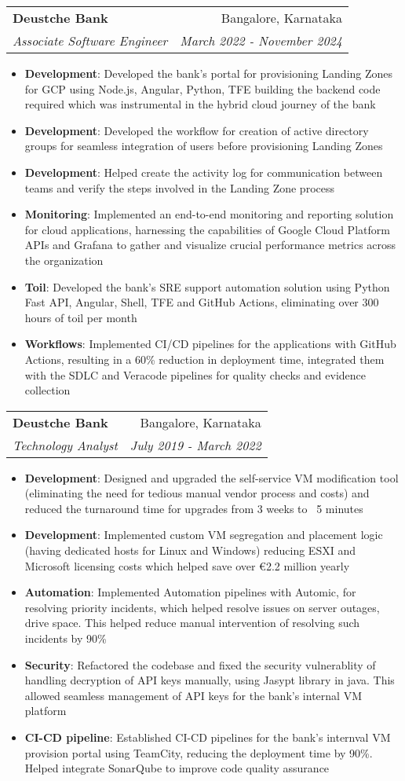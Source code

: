 \documentclass[letterpaper,11pt]{article}
\makeatletter
\newcommand{\resumeItem}[2]{
  \item\small{
    \textbf{#1}{: #2 \vspace{-2pt}}
  }
}
\newcommand{\resumeSubheading}[4]{
  \vspace{-1pt}\item
    \begin{tabular*}{0.97\textwidth}[t]{l@{\extracolsep{\fill}}r}
      \textbf{#1} & #2 \\
      \textit{\small#3} & \textit{\small #4} \\
    \end{tabular*}\vspace{-5pt}
}
\newcommand{\resumeItemListStart}{\begin{itemize}}
\newcommand{\resumeItemListEnd}{\end{itemize}\vspace{-5pt}}
\makeatother
\begin{document}
    \resumeSubheading
      {Deustche Bank}{Bangalore, Karnataka}
      {Associate Software Engineer}{March 2022 - November 2024}
      \resumeItemListStart
        \resumeItem{Development}
          {Developed the bank's portal for provisioning Landing Zones for GCP using Node.js, Angular, Python, TFE building the backend code required which was instrumental in the hybrid cloud journey of the bank}
        \resumeItem{Development}
          {Developed the workflow for creation of active directory groups for seamless integration of users before provisioning Landing Zones}
        \resumeItem{Development}
          {Helped create the activity log for communication between teams and verify the steps involved in the Landing Zone process}
        \resumeItem{Monitoring}
          {Implemented an end-to-end monitoring and reporting solution for cloud applications, harnessing the capabilities of Google Cloud Platform APIs and Grafana to gather and visualize crucial performance metrics across the organization}     
        \resumeItem{Toil}
          {Developed the bank's SRE support automation solution using Python Fast API, Angular, Shell, TFE and GitHub Actions, eliminating over 300 hours of toil per month}
        \resumeItem{Workflows}
          {Implemented CI/CD pipelines for the applications with GitHub Actions, resulting in a 60\% reduction in deployment time, integrated them with the SDLC and Veracode pipelines for quality checks and evidence collection}
      \resumeItemListEnd
       

    \resumeSubheading
      {Deustche Bank}{Bangalore, Karnataka}
      {Technology Analyst}{July 2019 - March 2022}
      \resumeItemListStart
        \resumeItem{Development}
          {Designed and upgraded the self-service VM modification tool (eliminating the need for tedious manual vendor process and costs) and reduced the turnaround time for upgrades from 3 weeks to ~5 minutes} 
        \resumeItem{Development}
          {Implemented custom VM segregation and placement logic (having dedicated hosts for Linux and Windows) reducing ESXI and Microsoft licensing costs which helped save over €2.2 million yearly} 
        \resumeItem{Automation}
          {Implemented Automation pipelines with Automic, for resolving priority incidents, which helped resolve issues on server outages, drive space. This helped reduce manual intervention of resolving such incidents by 90\%} 
        \resumeItem{Security}
          {Refactored the codebase and fixed the security vulnerablity of handling decryption of API keys manually, using Jasypt library in java. This allowed seamless management of API keys for the bank's internal VM platform}
        \resumeItem{CI-CD pipeline}
          {Established CI-CD pipelines for the bank's internval VM provision portal using TeamCity, reducing the deployment time by 90\%. Helped integrate SonarQube to improve code quality assurance }
      \resumeItemListEnd
    
\end{document}
